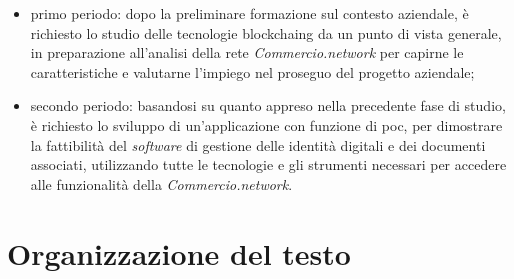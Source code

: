 \begin{itemize}
	\item primo periodo: dopo la preliminare formazione sul contesto aziendale, è richiesto lo studio delle tecnologie \gls{blockchaing} da un punto di vista generale, in preparazione all'analisi della rete \textit{Commercio.network} per capirne le caratteristiche e valutarne l'impiego nel proseguo del progetto aziendale;
	\item secondo periodo: basandosi su quanto appreso nella precedente fase di studio, è richiesto lo sviluppo di un'applicazione con funzione di \gls{poc}\glsfirstoccur{}, per dimostrare la fattibilità del \textit{software} di gestione delle identità digitali e dei documenti associati, utilizzando tutte le tecnologie e gli strumenti necessari per accedere alle funzionalità della \textit{Commercio.network}. 
 \end{itemize}

\section{Organizzazione del testo}

